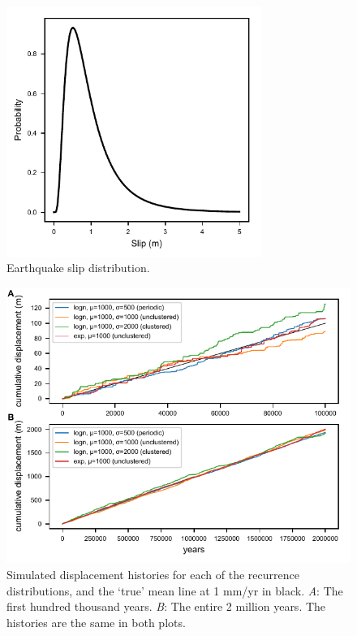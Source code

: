 \documentclass[se, manuscript]{copernicus}
\begin{document}
\clearpage

\begin{figure}[t]
\includegraphics[width=8.3cm]{./figures/slip_dist.pdf}
\caption{Earthquake slip distribution. \label{slip_dist}}
\end{figure}

\clearpage

\begin{figure}[t]
  \includegraphics[width=12cm]{./figures/disp_histories.pdf}
  \caption{Simulated displacement histories for each of the recurrence 
  distributions, and the `true' mean line at 1 mm/yr in black. \emph{A}: The 
  first hundred thousand years. \emph{B}: The entire 2 million years. The 
  histories are the same in both plots. \label{disp_histories}}
\end{figure}


\clearpage
\end{document}
